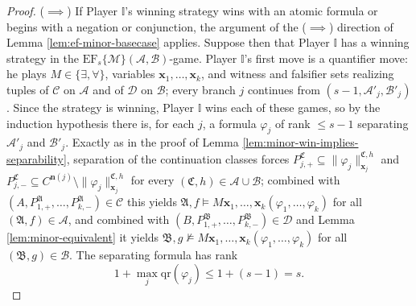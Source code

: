 \documentclass{article}
\theoremstyle{definition}
\begin{document}
\begin{proof}
    ($\implies$) If Player $\mathbb{I}$'s winning strategy wins with an atomic formula or begins with a negation or conjunction, the argument of the ($\implies$) direction of Lemma \ref{lem:ef-minor-basecase} applies. Suppose then that Player $\mathbb{I}$ has a winning strategy in the $\mathrm{EF}_s\{\mathcal{M}\}(\mathcal{A},\mathcal{B})$-game. Player $\mathbb{I}$'s first move is a quantifier move: he plays $M\in\{\exists,\forall\}$, variables $\mathbf x_1,\dots,\mathbf x_k$, and witness and falsifier sets realizing tuples of $\mathcal C$ on $\mathcal A$ and of $\mathcal D$ on $\mathcal B$; every branch $j$ continues from $(s-1,\mathcal A'_j,\mathcal B'_j)$. Since the strategy is winning, Player $\mathbb{I}$ wins each of these games, so by the induction hypothesis there is, for each $j$, a formula $\varphi_j$ of rank $\le s-1$ separating $\mathcal A'_j$ and $\mathcal B'_j$. Exactly as in the proof of Lemma \ref{lem:minor-win-implies-separability}, separation of the continuation classes forces $P^{\mathfrak C}_{j,+}\subseteq\|\varphi_j\|^{\mathfrak C,h}_{\mathbf x_j}$ and $P^{\mathfrak C}_{j,-}\subseteq C^{\mathbf n(j)}\setminus\|\varphi_j\|^{\mathfrak C,h}_{\mathbf x_j}$ for every $(\mathfrak C,h)\in\mathcal A\cup\mathcal B$; combined with $(A,P^\mathfrak{A}_{1,+},\dots,P^\mathfrak{A}_{k,-})\in\mathcal C$ this yields $\mathfrak A,f\models M\mathbf x_1,\dots,\mathbf x_k(\varphi_1,\dots,\varphi_k)$ for all $(\mathfrak A,f)\in\mathcal A$, and combined with $(B,P^\mathfrak{B}_{1,+},\dots,P^\mathfrak{B}_{k,-})\in\mathcal D$ and Lemma \ref{lem:minor-equivalent} it yields $\mathfrak B,g\not\models M\mathbf x_1,\dots,\mathbf x_k(\varphi_1,\dots,\varphi_k)$ for all $(\mathfrak B,g)\in\mathcal B$. The separating formula has rank
    \[
        1+\max_j\mathrm{qr}(\varphi_j)\le 1+(s-1)=s.
    \]


\end{proof}
\end{document}
